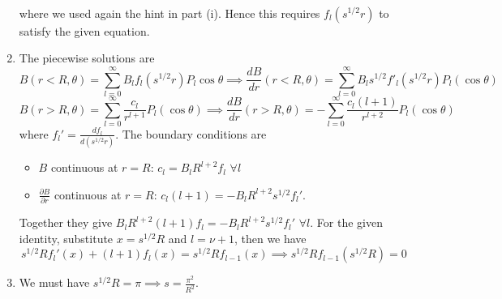 \documentclass[a4paper]{article}
\begin{document}
\begin{ans}
\begin{enumerate}[label=(\roman*)]
\begin{eqnarray}
\end{eqnarray}
where we used again the hint in part (i). Hence this requires $f_l(s^{1/2}r)$ to satisfy the given equation.
\item The piecewise solutions are
$$B(r<R,\theta)=\sum_{l=0}^\infty B_lf_l(s^{1/2}r)P_l\cos\theta\implies\frac{dB}{dr}(r<R,\theta)=\sum_{l=0}^\infty B_ls^{1/2}f'_l(s^{1/2}r)P_l(\cos\theta)$$
$$B(r>R,\theta)=\sum_{l=0}^\infty\frac{c_l}{r^{l+1}}P_l(\cos\theta)\implies\frac{dB}{dr}(r>R,\theta)=-\sum_{l=0}^\infty\frac{c_l(l+1)}{r^{l+2}}P_l(\cos\theta)$$
where $f_l'=\frac{df_l}{d(s^{1/2}r)}$. The boundary conditions are
\begin{itemize}
    \item $B$ continuous at $r=R$: $c_l=B_lR^{l+2}f_l$ $\forall l$
    \item $\frac{\partial B}{\partial r}$ continuous at $r=R$: $c_l(l+1)=-B_lR^{l+2}s^{1/2}f_l'$. 
\end{itemize}
Together they give $B_lR^{l+2}(l+1)f_l=-B_lR^{l+2}s^{1/2}f_l'$ $\forall l$. For the given identity, substitute $x=s^{1/2}R$ and $l=\nu+1$, then we have
$$s^{1/2}Rf_l'(x)+(l+1)f_l(x)=s^{1/2}Rf_{l-1}(x)\implies s^{1/2}Rf_{l-1}(s^{1/2}R)=0$$
\item We must have $s^{1/2}R=\pi\implies s=\frac{\pi^2}{R^2}$.
\end{enumerate}
\end{ans}
\newpage
\end{document}
